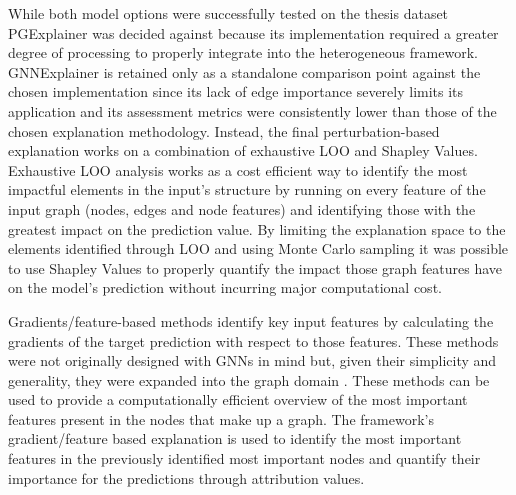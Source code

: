         While both model options were successfully tested on the thesis dataset PGExplainer was decided against because its implementation required a greater degree of processing to properly integrate into the heterogeneous framework. GNNExplainer is retained only as a standalone comparison point against the chosen implementation since its lack of edge importance severely limits its application and its assessment metrics were consistently lower than those of the chosen explanation methodology.  
        Instead, the final perturbation-based explanation works on a combination of exhaustive LOO and Shapley Values. Exhaustive LOO analysis works as a cost efficient way to identify the most impactful elements in the input's structure by running on every feature of the input graph (nodes, edges and node features) and identifying those with the greatest impact on the prediction value. By limiting the explanation space to the elements identified through LOO and using Monte Carlo sampling it was possible to use Shapley Values to properly quantify the impact those graph features have on the model's prediction without incurring major computational cost.
        
        Gradients/feature-based methods identify key input features by calculating the gradients of the target prediction with respect to those features. These methods were not originally designed with GNNs in mind but, given their simplicity and generality, they were expanded into the graph domain \cite{sundararajan2017}. These methods can be used to provide a computationally efficient overview of the most important features present in the nodes that make up a graph. The framework's gradient/feature based explanation is used to identify the most important features in the previously identified most important nodes and quantify their importance for the predictions through attribution values. 

    
